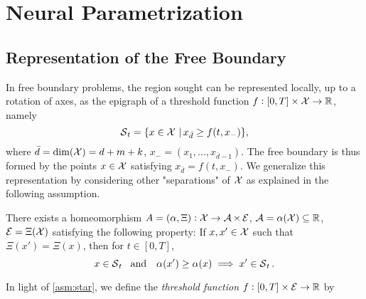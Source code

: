 \section{Neural Parametrization}

\subsection{Representation of the Free Boundary}

In free boundary problems, 
the region sought can be represented locally, up to a rotation of axes, as the epigraph of a threshold function $f: [0,T]\times \operatorname{\mathcal{X}} \to \operatorname{\mathbb{R}}$, namely
$$\operatorname{\mathcal{S}}_t = \{x\in \operatorname{\mathcal{X}} \,|\, x_{\bar{d}} \ge f(t,x_{-})\},$$
where $\bar{d}= \text{dim}(\operatorname{\mathcal{X}})= d+m+k$,  $x_{-}=(x_1,...,x_{\bar{d}-1})$. 
The free boundary is thus formed by the points $x\in \operatorname{\mathcal{X}}$ satisfying  $x_{\bar{d}} = f(t,x_{-})$. We generalize this representation by considering other "separations" of $\operatorname{\mathcal{X}}$ as explained in the following assumption.  

\begin{asm}
\label{asm:star}
There exists a homeomorphism $A=(\alpha,\Xi) : \operatorname{\mathcal{X}}  \to \operatorname{\mathcal{A}} \times \operatorname{\mathcal{E}}$, $\operatorname{\mathcal{A}} = \alpha(\operatorname{\mathcal{X}}) \subseteq \operatorname{\mathbb{R}}$, $\operatorname{\mathcal{E}} = \Xi(\operatorname{\mathcal{X}})$  
satisfying the following property: If $x,x' \in \operatorname{\mathcal{X}}$ such that  $\Xi(x')=\Xi(x)$, then for $t\in [0,T]$, 
\begin{equation*}
   x \in \calS_t \ \textnormal{ and } \ \ \alpha(x') \ge \alpha(x)  \; \Longrightarrow  \;
x' \in \calS_t.
\end{equation*}
\end{asm} 

In light of \cref{asm:star},  we define the \textit{threshold function} $
f: [0,T]\times \operatorname{\mathcal{E}} \to \operatorname{\mathbb{R}}$  by 

